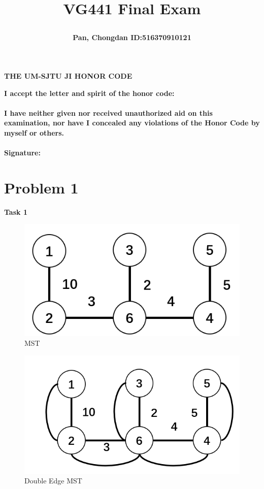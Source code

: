 \documentclass[a4paper]{article}
\title{\Large \textbf{VG441 Final Exam}\\
\author{\textbf{Pan, Chongdan ID:516370910121}\\
}
}
\begin{document}
\maketitle
\begin{center}
    \textbf{\Large{THE UM-SJTU JI HONOR CODE}}
\end{center}

\noindent\textbf{I accept the letter and spirit of the honor code:\\\\
I have neither given nor received unauthorized aid on this examination, nor have
I concealed any violations of the Honor Code by myself or others.\\\\Signature:}
\section{Problem 1}
\noindent \textbf{Task 1}
    \begin{figure}[H]
        \centering
        \includegraphics[scale=0.25]{P1.png}
        \caption{MST}
    \end{figure}
    \begin{figure}[H]
        \centering
        \includegraphics[scale=0.25]{P2.png}
        \caption{Double Edge MST}
    \end{figure}
\end{document}
